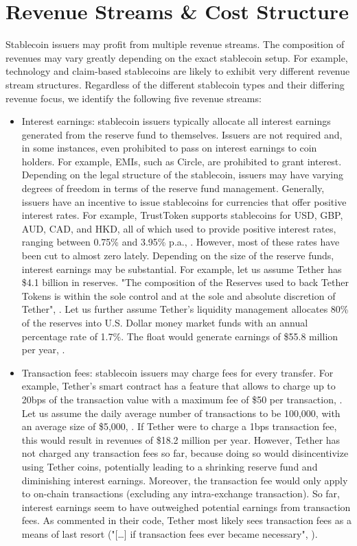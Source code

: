 \documentclass[conference]{IEEEtran}
\begin{document}
\section{Revenue Streams \& Cost Structure}
\label{sec:businesscase}
Stablecoin issuers may profit from multiple revenue streams. The composition of revenues may vary greatly depending on the exact stablecoin setup. For example, technology and claim-based stablecoins are likely to exhibit very different revenue stream structures. Regardless of the different stablecoin types and their differing revenue focus, we identify the following five revenue streams:

\begin{itemize}
	\item Interest earnings: stablecoin issuers typically allocate all interest earnings generated from the reserve fund to themselves. Issuers are not required and, in some instances, even prohibited to pass on interest earnings to coin holders. For example, \acp{EMI}, such as Circle, are prohibited to grant interest. Depending on the legal structure of the stablecoin, issuers may have varying degrees of freedom in terms of the reserve fund management. Generally, issuers have an incentive to issue stablecoins for currencies that offer positive interest rates. For example, TrustToken supports stablecoins for USD, GBP, AUD, CAD, and HKD, all of which used to provide positive interest rates, ranging between 0.75\% and 3.95\% p.a., \cite{TrustToken2}. However, most of these rates have been cut to almost zero lately. Depending on the size of the reserve funds, interest earnings may be substantial. For example, let us assume Tether has \$4.1 billion in reserves. "The composition of the Reserves used to back Tether Tokens is within the sole control and at the sole and absolute discretion of Tether", \cite{Tether3}. Let us further assume Tether's liquidity management allocates 80\% of the reserves into U.S. Dollar money market funds with an annual percentage rate of 1.7\%. The float would generate earnings of \$55.8 million per year, \cite{SwissFundData}.
	\item Transaction fees: stablecoin issuers may charge fees for every transfer. For example, Tether's smart contract has a feature that allows to charge up to 20bps of the transaction value with a maximum fee of \$50 per transaction, \cite{Etherscan}. Let us assume the daily average number of transactions to be 100,000, with an average size of \$5,000, \cite{Etherscan2}. If Tether were to charge a 1bps transaction fee, this would result in revenues of \$18.2 million per year. However, Tether has not charged any transaction fees so far, because doing so would disincentivize using Tether coins, potentially leading to a shrinking reserve fund and diminishing interest earnings. Moreover, the transaction fee would only apply to on-chain transactions (excluding any intra-exchange transaction). So far, interest earnings seem to have outweighed potential earnings from transaction fees. As commented in their code, Tether most likely sees transaction fees as a means of last resort ("[…] if transaction fees ever became necessary", \cite{Etherscan3}).

\end{itemize}
\end{document}
